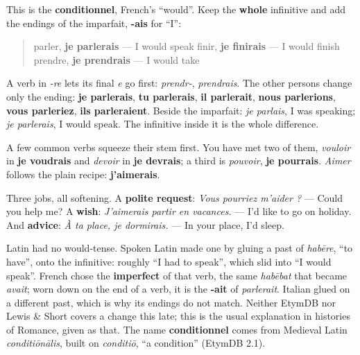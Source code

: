 \begin{grammarlens}[title={Grammar Lens: the infinitive, plus the imparfait's endings}]
This is the \textbf{conditionnel}, French's \textquotedblleft{}would\textquotedblright{}. Keep the \textbf{whole} infinitive and add the endings of the imparfait, \textbf{-ais} for \textquotedblleft{}I\textquotedblright{}:

\begin{quote}
parler, \textbf{je parlerais} — I would speak finir, \textbf{je finirais} — I would finish prendre, \textbf{je prendrais} — I would take
\end{quote}

A verb in \emph{-re} lets its final \emph{e} go first: \emph{prendr-}, \emph{prendrais}. The other persons change only the ending: \textbf{je parlerais}, \textbf{tu parlerais}, \textbf{il parlerait}, \textbf{nous parlerions}, \textbf{vous parleriez}, \textbf{ils parleraient}. Beside the imparfait: \emph{je parlais}, I was speaking; \emph{je parlerais}, I would speak. The infinitive inside it is the whole difference.

A few common verbs squeeze their stem first. You have met two of them, \emph{vouloir} in \textbf{je voudrais} and \emph{devoir} in \textbf{je devrais}; a third is \emph{pouvoir}, \textbf{je pourrais}. \emph{Aimer} follows the plain recipe: \textbf{j'aimerais}.

Three jobs, all softening. A \textbf{polite request}: \emph{Vous pourriez m'aider ?} — Could you help me? A \textbf{wish}: \emph{J'aimerais partir en vacances.} — I'd like to go on holiday. And \textbf{advice}: \emph{À ta place, je dormirais.} — In your place, I'd sleep.
\end{grammarlens}

\begin{cousinweb}
Latin had no would-tense. Spoken Latin made one by gluing a past of \emph{habēre}, \textquotedblleft{}to have\textquotedblright{}, onto the infinitive: roughly \textquotedblleft{}I had to speak\textquotedblright{}, which slid into \textquotedblleft{}I would speak\textquotedblright{}. French chose the \textbf{imperfect} of that verb, the same \emph{habēbat} that became \emph{avait}; worn down on the end of a verb, it is the \textbf{-ait} of \emph{parlerait}. Italian glued on a different past, which is why its endings do not match. Neither EtymDB nor Lewis \& Short covers a change this late; this is the usual explanation in histories of Romance, given as that. The name \textbf{conditionnel} comes from Medieval Latin \emph{conditiōnālis}, built on \emph{conditiō}, \textquotedblleft{}a condition\textquotedblright{} (EtymDB 2.1).
\end{cousinweb}

